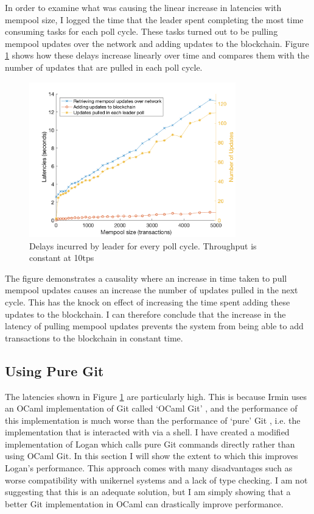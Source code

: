 \documentclass[12pt,a4paper,twoside,openright]{report}
\begin{document}
	In order to examine what was causing the linear increase in latencies with mempool size, I logged the time that the leader spent completing the most time consuming tasks for each poll cycle.
	These tasks turned out to be pulling mempool updates over the network and adding updates to the blockchain.
	Figure \ref{figs:leaderdelays} shows how these delays increase linearly over time and compares them with the number of updates that are pulled in each poll cycle.
	\begin{figure}
		\centering
		\includegraphics[width=0.8\textwidth]{figs/leader_delays_num_pulled.png}
		\caption{Delays incurred by leader for every poll cycle. Throughput is constant at 10tps}
		\label{figs:leaderdelays}
	\end{figure}
	The figure demonstrates a causality where an increase in time taken to pull mempool updates causes an increase the number of updates pulled in the next cycle. 
	This has the knock on effect of increasing the time spent adding these updates to the blockchain.
	I can therefore conclude that the increase in the latency of pulling mempool updates prevents the system from being able to add transactions to the blockchain in constant time. \\

	\subsection{Using Pure Git}
	The latencies shown in Figure \ref{figs:leaderdelays} are particularly high. 
	This is because Irmin uses an OCaml implementation of Git called `OCaml Git' \parencite{OcamlGit}, and the performance of this implementation is much worse than the performance of `pure' Git \parencite{Git}, i.e. the implementation that is interacted with via a shell.
	I have created a modified implementation of Logan which calls pure Git commands directly rather than using OCaml Git.
	In this section I will show the extent to which this improves Logan's performance.
	This approach comes with many disadvantages such as worse compatibility with unikernel systems and a lack of type checking.
	I am not suggesting that this is an adequate solution, but I am simply showing that a better Git implementation in OCaml can drastically improve performance.\\ 
\end{document}
